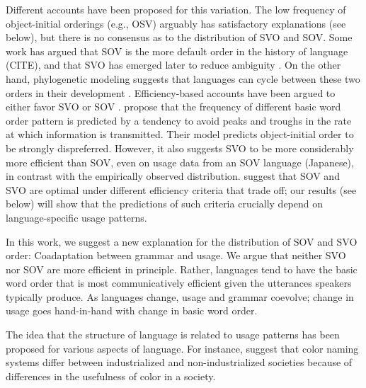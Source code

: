 \documentclass[11pt,a4paper]{article}
\newcommand\comment[1]{{\color{red}#1}}
\begin{document}
Different accounts have been proposed for this variation.
The low frequency of object-initial orderings (e.g., OSV) arguably has satisfactory explanations (see below), but there is no consensus as to the distribution of SVO and SOV.
Some work has argued that SOV is the more default order in the history of language (CITE), and that SVO has emerged later to reduce ambiguity \citep{gibson-noisy-channel-2013}.
On the other hand, phylogenetic modeling suggests that languages can cycle between these two orders in their development \citep{maurits2014tracing}.
Efficiency-based accounts have been argued to either favor SVO or SOV \citep{maurits-why-2010, ferrer-i-cancho-placement-2017}.
\cite{maurits2010why} propose that the frequency of different basic word order pattern is predicted by a tendency to avoid peaks and troughs in the rate at which information is transmitted.
Their model predicts object-initial order to be strongly dispreferred.
However, it also suggests SVO to be more considerably more efficient than SOV, even on usage data from an SOV language (Japanese), in contrast with the empirically observed distribution.
\citep{ferrer-i-cancho-placement-2017} suggest that SOV and SVO are optimal under different efficiency criteria that trade off; our results (see below) will show that the predictions of such criteria crucially depend on language-specific usage patterns.

In this work, we suggest a new explanation for the distribution of SOV and SVO order:
{Coadaptation} between grammar and usage.
We argue that neither SVO nor SOV are more efficient in principle.
Rather, languages tend to have the basic word order that is most communicatively efficient given the utterances speakers typically produce.
As languages change, usage and grammar coevolve; change in usage goes hand-in-hand with change in basic word order.

The idea that the structure of language is related to usage patterns has been proposed for various aspects of language.
For instance, \cite{gibson2017color} suggest that color naming systems differ between industrialized and non-industrialized societies because of differences in the usefulness of color in a society.
\end{document}
